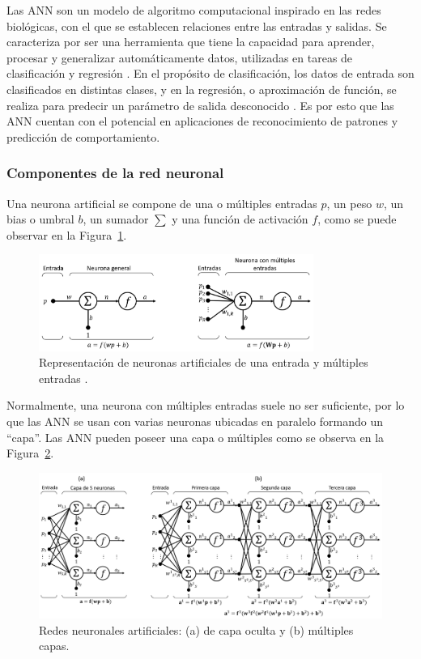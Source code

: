  Las ANN son un modelo de algoritmo computacional inspirado en las redes biológicas, con el que se establecen relaciones entre las entradas y salidas. Se caracteriza por ser una herramienta que tiene la capacidad para aprender, procesar y generalizar automáticamente datos, utilizadas en tareas de clasificación y regresión \citep{NeuronalNet2014}. En el propósito de clasificación, los datos de entrada son clasificados en distintas clases, y en la regresión, o aproximación de función, se realiza para predecir un parámetro de salida desconocido \citep{NeuronalNet2014}. Es por esto que las ANN cuentan con el potencial en aplicaciones de reconocimiento de patrones y predicción de comportamiento.

 \subsubsection{Componentes de la red neuronal}

 Una neurona artificial se compone de una o múltiples entradas $p$, un peso $w$, un bias o umbral $b$, un sumador $\sum$ y una función de activación $f$, como se puede observar en la Figura~\ref{fig:Neu_Diag}. 

 \begin{figure}[!h]
     \centering
     \includegraphics[width=0.8\textwidth]
     {Imagenes/Neu_Diag.png}
     \caption{Representación de neuronas artificiales de una entrada y múltiples entradas \citep{NeuronalNet2014}.}
\label{fig:Neu_Diag}
 \end{figure}

 Normalmente, una neurona con múltiples entradas suele no ser suficiente, por lo que las ANN se usan con varias neuronas ubicadas en paralelo formando un “capa”. Las ANN pueden poseer una capa o múltiples como se observa en la Figura~\ref{fig:Net_conjunt}.

  \begin{figure}[!h]
     \centering
     \includegraphics[width=.9\textwidth]{Imagenes/ConjuntoANN.png}
     \caption{Redes neuronales artificiales: (a) de capa oculta y (b) múltiples capas.}
    \label{fig:Net_conjunt}
 \end{figure}



